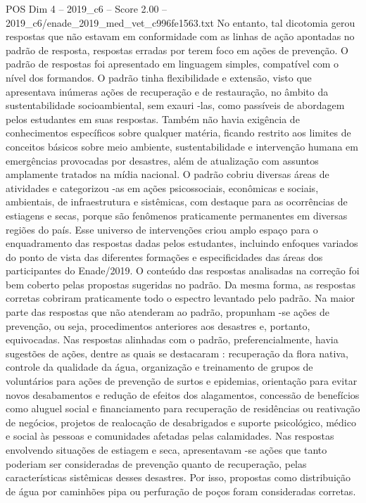 \begin{textsample}{POS Dim 4 – 2019\_c6 – Score 2.00 – 2019\_c6/enade\_2019\_med\_vet\_c996fe1563.txt}
No entanto, tal dicotomia gerou respostas que não estavam em conformidade com as linhas de ação apontadas no padrão de resposta, respostas erradas por terem foco em ações de prevenção.
O padrão de respostas foi apresentado em linguagem simples, compatível com o nível dos formandos.
O padrão tinha flexibilidade e extensão, visto que apresentava inúmeras ações de recuperação e de restauração, no âmbito da sustentabilidade socioambiental, sem exauri -las, como passíveis de abordagem pelos estudantes em suas respostas.
Também não havia exigência de conhecimentos específicos sobre qualquer matéria, ficando restrito aos limites de conceitos básicos sobre meio ambiente, sustentabilidade e intervenção humana em emergências provocadas por desastres, além de atualização com assuntos amplamente tratados na mídia nacional.
O padrão cobriu diversas áreas de atividades e categorizou -as em ações psicossociais, econômicas e sociais, ambientais, de infraestrutura e sistêmicas, com destaque para as ocorrências de estiagens e secas, porque são fenômenos praticamente permanentes em diversas regiões do país.
Esse universo de intervenções criou amplo espaço para o enquadramento das respostas dadas pelos estudantes, incluindo enfoques variados do ponto de vista das diferentes formações e especificidades das áreas dos participantes do Enade/2019.
O conteúdo das respostas analisadas na correção foi bem coberto pelas propostas sugeridas no padrão.
Da mesma forma, as respostas corretas cobriram praticamente todo o espectro levantado pelo padrão.
Na maior parte das respostas que não atenderam ao padrão, propunham -se ações de prevenção, ou seja, procedimentos anteriores aos desastres e, portanto, equivocadas.
Nas respostas alinhadas com o padrão, preferencialmente, havia sugestões de ações, dentre as quais se destacaram : recuperação da flora nativa, controle da qualidade da água, organização e treinamento de grupos de voluntários para ações de prevenção de surtos e epidemias, orientação para evitar novos desabamentos e redução de efeitos dos alagamentos, concessão de benefícios como aluguel social e financiamento para recuperação de residências ou reativação de negócios, projetos de realocação de desabrigados e suporte psicológico, médico e social às pessoas e comunidades afetadas pelas calamidades.
Nas respostas envolvendo situações de estiagem e seca, apresentavam -se ações que tanto poderiam ser consideradas de prevenção quanto de recuperação, pelas características sistêmicas desses desastres.
Por isso, propostas como distribuição de água por caminhões pipa ou perfuração de poços foram consideradas corretas.

\end{textsample}
